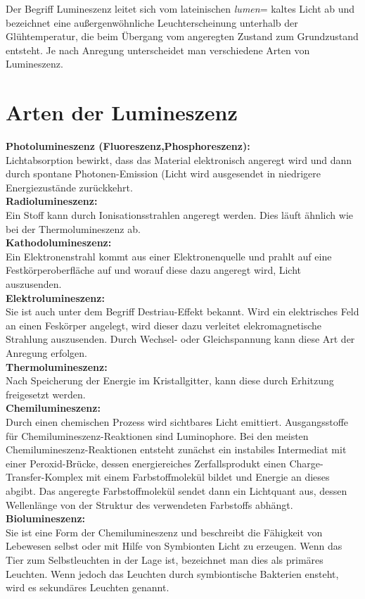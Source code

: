
Der Begriff Lumineszenz leitet sich vom lateinischen \emph{lumen}= kaltes Licht ab und bezeichnet eine außergenwöhnliche Leuchterscheinung unterhalb der Glühtemperatur, die beim Übergang vom angeregten Zustand zum Grundzustand entsteht. Je nach Anregung  unterscheidet man verschiedene Arten von Lumineszenz.
\section{Arten der Lumineszenz}
\textbf{Photolumineszenz (Fluoreszenz,Phosphoreszenz):}
\\Lichtabsorption bewirkt, dass das Material elektronisch angeregt wird und dann durch spontane Photonen-Emission (Licht wird ausgesendet in niedrigere Energiezustände zurückkehrt. 
\\\textbf{Radiolumineszenz:}
\\Ein Stoff kann durch Ionisationsstrahlen angeregt werden. Dies läuft ähnlich wie bei der Thermolumineszenz ab.
\\\textbf{Kathodolumineszenz:}
\\Ein Elektronenstrahl kommt aus einer Elektronenquelle und prahlt auf eine
Festkörperoberfläche auf und worauf diese dazu angeregt wird, Licht auszusenden.
\\\textbf{Elektrolumineszenz:}
\\Sie ist auch unter dem Begriff Destriau-Effekt bekannt. Wird ein elektrisches Feld an einen Feskörper angelegt, wird dieser dazu verleitet elekromagnetische Strahlung auszusenden. Durch Wechsel- oder Gleichspannung kann diese Art der Anregung erfolgen.
\\\textbf{Thermolumineszenz:}
\\Nach Speicherung der Energie im Kristallgitter, kann diese durch Erhitzung freigesetzt werden.
\\\textbf{Chemilumineszenz:}
\\Durch einen chemischen Prozess wird sichtbares Licht emittiert. Ausgangsstoffe für Chemilumineszenz-Reaktionen sind Luminophore. Bei den meisten Chemilumineszenz-Reaktionen entsteht zunächst ein instabiles Intermediat mit einer Peroxid-Brücke, dessen energiereiches Zerfallsprodukt einen Charge-Transfer-Komplex mit einem Farbstoffmolekül bildet und Energie an dieses abgibt. Das angeregte Farbstoffmolekül sendet dann ein Lichtquant aus, dessen Wellenlänge von der Struktur des verwendeten Farbstoffs abhängt.
\\\textbf{Biolumineszenz:}
\\Sie ist eine Form der Chemilumineszenz und beschreibt die Fähigkeit von Lebewesen selbst oder mit Hilfe von Symbionten Licht zu erzeugen. Wenn das Tier zum Selbstleuchten in der Lage ist, bezeichnet man dies als primäres Leuchten. Wenn jedoch das Leuchten durch symbiontische Bakterien ensteht, wird es sekundäres Leuchten genannt. \cite{[1]}

